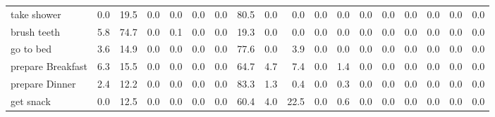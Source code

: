 \documentclass{article}
\begin{document}
\begin{sideways}
\begin{tabular}{lrrrrrrrrrrrrrrrrr}
take shower                   &         0.0 &               19.5 &           0.0 &               0.0 &                0.0 &                0.0 &             80.5 &                      0.0 &                   0.0 &              0.0 &              0.0 &                            0.0 &                      0.0 &                    0.0 &                                  0.0 &                          0.0 &                  0.0 \\
brush teeth                   &         5.8 &               74.7 &           0.0 &               0.1 &                0.0 &                0.0 &             19.3 &                      0.0 &                   0.0 &              0.0 &              0.0 &                            0.0 &                      0.0 &                    0.0 &                                  0.0 &                          0.0 &                  0.0 \\
go to bed                     &         3.6 &               14.9 &           0.0 &               0.0 &                0.0 &                0.0 &             77.6 &                      0.0 &                   3.9 &              0.0 &              0.0 &                            0.0 &                      0.0 &                    0.0 &                                  0.0 &                          0.0 &                  0.0 \\
prepare Breakfast             &         6.3 &               15.5 &           0.0 &               0.0 &                0.0 &                0.0 &             64.7 &                      4.7 &                   7.4 &              0.0 &              1.4 &                            0.0 &                      0.0 &                    0.0 &                                  0.0 &                          0.0 &                  0.0 \\
prepare Dinner                &         2.4 &               12.2 &           0.0 &               0.0 &                0.0 &                0.0 &             83.3 &                      1.3 &                   0.4 &              0.0 &              0.3 &                            0.0 &                      0.0 &                    0.0 &                                  0.0 &                          0.0 &                  0.0 \\
get snack                     &         0.0 &               12.5 &           0.0 &               0.0 &                0.0 &                0.0 &             60.4 &                      4.0 &                  22.5 &              0.0 &              0.6 &                            0.0 &                      0.0 &                    0.0 &                                  0.0 &                          0.0 &                  0.0 \\

\end{tabular}
\end{sideways}
\end{document}
